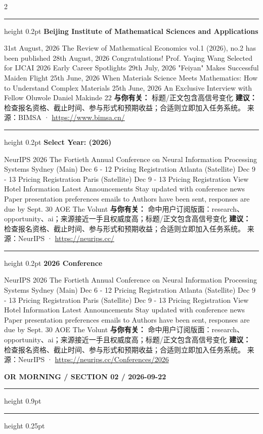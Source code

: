 \documentclass[10.5pt]{ctexart}
\begin{document}
\begin{multicols}{2}
\hrule height 0.2pt
\vspace{2mm}
{\large\bfseries Beijing Institute of Mathematical Sciences and Applications}\par
31st August, 2026 The Review of Mathematical Economics vol.1 (2026), no.2 has been published 28th August, 2026 Congratulations! Prof. Yaqing Wang Selected for IJCAI 2026 Early Career Spotlights 29th July, 2026 "Feiyan" Makes Successful Maiden Flight 25th June, 2026 When Materials Science Meets Mathematics: How to Understand Complex Materials 25th June, 2026 An Exclusive Interview with Fellow Oluwole Daniel Makinde 22
\textbf{与你有关：} 标题/正文包含高信号变化
\textbf{建议：} 检查报名资格、截止时间、参与形式和预期收益；合适则立即加入任务系统。
{\footnotesize\color{ormuted} 来源：BIMSA · \url{https://www.bimsa.cn/}}
\vspace{2mm}
\hrule height 0.2pt
\vspace{2mm}
{\large\bfseries Select Year: (2026)}\par
NeurIPS 2026 The Fortieth Annual Conference on Neural Information Processing Systems Sydney (Main) Dec 6 - 12 Pricing Registration Atlanta (Satellite) Dec 9 - 13 Pricing Registration Paris (Satellite) Dec 9 - 13 Pricing Registration View Hotel Information Latest Announcements Stay updated with conference news Paper presentation preferences emails to Authors have been sent, responses are due by Sept. 30 AOE The Volunt
\textbf{与你有关：} 命中用户订阅版面：research、opportunity、ai；来源接近一手且权威度高；标题/正文包含高信号变化
\textbf{建议：} 检查报名资格、截止时间、参与形式和预期收益；合适则立即加入任务系统。
{\footnotesize\color{ormuted} 来源：NeurIPS · \url{https://neurips.cc/}}
\vspace{2mm}
\hrule height 0.2pt
\vspace{2mm}
{\large\bfseries 2026 Conference}\par
NeurIPS 2026 The Fortieth Annual Conference on Neural Information Processing Systems Sydney (Main) Dec 6 - 12 Pricing Registration Atlanta (Satellite) Dec 9 - 13 Pricing Registration Paris (Satellite) Dec 9 - 13 Pricing Registration View Hotel Information Latest Announcements Stay updated with conference news Paper presentation preferences emails to Authors have been sent, responses are due by Sept. 30 AOE The Volunt
\textbf{与你有关：} 命中用户订阅版面：research、opportunity、ai；来源接近一手且权威度高；标题/正文包含高信号变化
\textbf{建议：} 检查报名资格、截止时间、参与形式和预期收益；合适则立即加入任务系统。
{\footnotesize\color{ormuted} 来源：NeurIPS · \url{https://neurips.cc/Conferences/2026}}
\end{multicols}
\newpage
{\small\bfseries OR MORNING / SECTION 02 / 2026-09-22}
\vspace{2mm}
\hrule height 0.9pt
\vspace{1.5mm}
\hrule height 0.25pt
\vspace{4mm}
\end{document}
